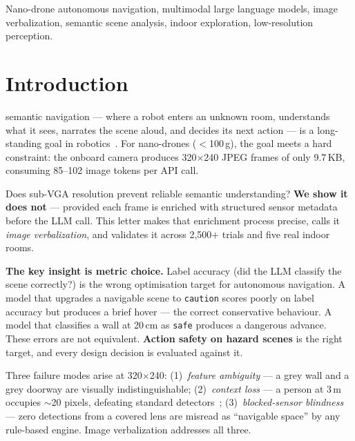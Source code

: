 \documentclass[journal]{IEEEtran}
\begin{document}
\begin{IEEEkeywords}
Nano-drone autonomous navigation, multimodal large language models,
image verbalization, semantic scene analysis, indoor exploration,
low-resolution perception.
\end{IEEEkeywords}

\section{Introduction}
\label{sec:intro}

 semantic navigation --- where a robot
enters an unknown room, understands what it sees, narrates the
scene aloud, and decides its next action --- is a long-standing
goal in robotics~\cite{ahn2022saycan,huang2022innermonologue}.
For nano-drones ($<$100\,g), the goal meets a hard constraint:
the onboard camera produces 320$\times$240 JPEG frames of only
9.7\,KB, consuming 85--102 image tokens per API call.

Does sub-VGA resolution prevent reliable semantic understanding?
\textbf{We show it does not} --- provided each frame is enriched
with structured sensor metadata before the LLM call.
This letter makes that enrichment process precise, calls it
\emph{image verbalization}, and validates it across 2,500$+$
trials and five real indoor rooms.

\textbf{The key insight is metric choice.}
Label accuracy (did the LLM classify the scene correctly?) is the
wrong optimisation target for autonomous navigation.
A model that upgrades a navigable scene to \texttt{caution} scores
poorly on label accuracy but produces a brief hover --- the correct
conservative behaviour.
A model that classifies a wall at 20\,cm as \texttt{safe} produces
a dangerous advance.
These errors are not equivalent.
\textbf{Action safety on hazard scenes} is the right target, and
every design decision is evaluated against it.

Three failure modes arise at 320$\times$240:
(1)~\textit{feature ambiguity} --- a grey wall and a grey doorway
are visually indistinguishable;
(2)~\textit{context loss} --- a person at 3\,m occupies
$\sim$20 pixels, defeating standard
detectors~\cite{persondetectionuav2025,kim2024yoloihd};
(3)~\textit{blocked-sensor blindness} --- zero detections from a
covered lens are misread as ``navigable space'' by any rule-based
engine.
Image verbalization addresses all three.
\end{document}
